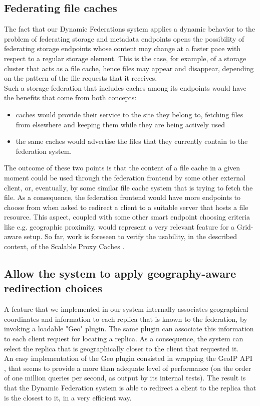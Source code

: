 \documentclass[12pt]{article} %
\begin{document}
\subsection{Federating file caches}

The fact that our Dynamic Federations system applies a dynamic behavior to the problem of federating storage and metadata endpoints opens the possibility of federating storage endpoints whose content may change at a faster pace with respect to a regular storage element.
This is the case, for example, of a storage cluster that acts as a file cache, hence files may appear and disappear, depending on the pattern of the file requests that it receives.\\
Such a storage federation that includes caches among its endpoints would have the benefits that come from both concepts:
\begin{itemize}
\item caches would provide their service to the site they belong to, fetching files from elsewhere and keeping them while they are being actively used
\item the same caches would advertise the files that they currently contain to the federation system.
\end{itemize}
The outcome of these two points is that the content of a file cache in a given moment could be used through the federation frontend by some other external client, or, eventually, by some similar file cache system that is trying to fetch the file. As a consequence, the federation frontend would have more endpoints to choose from when asked to redirect a client to a suitable server that hosts a file resource. This aspect, coupled with some other smart endpoint choosing criteria like e.g. geographic proximity, would represent a very relevant feature for a Grid-aware setup.
So far, work is foreseen to verify the usability, in the described context, of the Scalable Proxy Caches \cite{scalableproxycache}.


\subsection{Allow the system to apply geography-aware redirection choices}

A feature that we implemented in our system internally associates geographical coordinates and information to each replica that is known to the federation, by invoking a loadable "Geo" plugin. The same plugin can associate this information to each client request for locating a replica. As a consequence, the system can select the replica that is geographically closer to the client that requested it.\\
An easy implementation of the Geo plugin consisted in wrapping the GeoIP API \cite{geoip}, that seems to provide a more than adequate level of performance (on the order of one million queries per second, as output by its internal tests). The result is that the Dynamic Federation system is able to redirect a client to the replica that is the closest to it, in a very efficient way.
\end{document}
